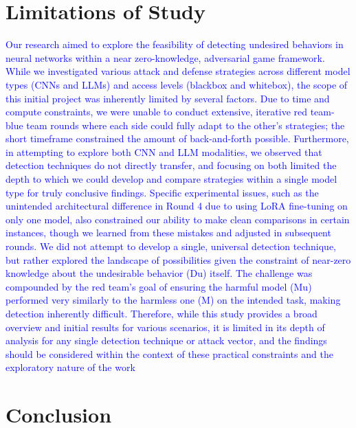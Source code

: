 \documentclass[letterpaper]{article} %
\begin{document}
\section{Limitations of Study}
\textcolor{blue}{
Our research aimed to explore the feasibility of detecting undesired behaviors in neural networks within a near zero-knowledge, adversarial game framework. While we investigated various attack and defense strategies across different model types (CNNs and LLMs) and access levels (blackbox and whitebox), the scope of this initial project was inherently limited by several factors. Due to time and compute constraints, we were unable to conduct extensive, iterative red team-blue team rounds where each side could fully adapt to the other's strategies; the short timeframe constrained the amount of back-and-forth possible. Furthermore, in attempting to explore both CNN and LLM modalities, we observed that detection techniques do not directly transfer, and focusing on both limited the depth to which we could develop and compare strategies within a single model type for truly conclusive findings. Specific experimental issues, such as the unintended architectural difference in Round 4 due to using LoRA fine-tuning on only one model, also constrained our ability to make clean comparisons in certain instances, though we learned from these mistakes and adjusted in subsequent rounds. We did not attempt to develop a single, universal detection technique, but rather explored the landscape of possibilities given the constraint of near-zero knowledge about the undesirable behavior (Du) itself. The challenge was compounded by the red team's goal of ensuring the harmful model (Mu) performed very similarly to the harmless one (M) on the intended task, making detection inherently difficult. Therefore, while this study provides a broad overview and initial results for various scenarios, it is limited in its depth of analysis for any single detection technique or attack vector, and the findings should be considered within the context of these practical constraints and the exploratory nature of the work
}

\section{Conclusion}
\end{document}
